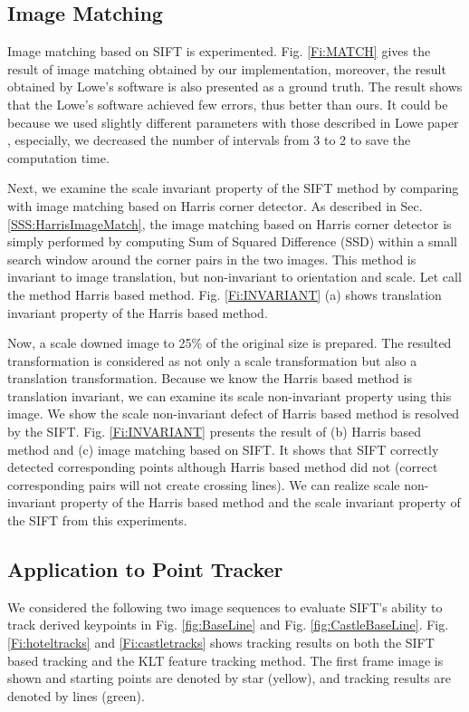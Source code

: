 \documentclass{article}
\begin{document}
\subsection{Image Matching}

Image matching based on SIFT is experimented. 
Fig. \ref{Fi:MATCH} gives the result of image matching obtained by our implementation, 
moreover, the result obtained by Lowe's software \cite{dLowe05} is also presented as a ground truth. 
The result shows that the Lowe's software achieved few errors, thus better than ours. 
It could be because we used slightly different parameters with those described in Lowe paper \cite{dLowe04}, 
especially, we decreased the number of intervals from 3 to 2 to save the computation time. 


Next, we examine the scale invariant property of the SIFT method by comparing with image matching based on Harris corner detector. 
As described in Sec. \ref{SSS:HarrisImageMatch}, the image matching based on Harris corner detector is simply performed 
by computing Sum of Squared Difference (SSD) within a small search window around the corner pairs in the two images. 
This method is invariant to image translation, but non-invariant to orientation and scale. 
Let call the method Harris based method. 
Fig. \ref{Fi:INVARIANT} (a) shows translation invariant property of the Harris based method. 

Now, a scale downed image to 25\% of the original size is prepared. 
The resulted transformation is considered as not only a scale transformation but also a translation transformation. 
Because we know the Harris based method is translation invariant, 
we can examine its scale non-invariant property using this image. 
We show the scale non-invariant defect of Harris based method is resolved by the SIFT. 
Fig. \ref{Fi:INVARIANT} presents the result of (b) Harris based method and (c) image matching based on SIFT. 
It shows that SIFT correctly detected corresponding points although Harris based method did not 
(correct corresponding pairs will not create crossing lines). 
We can realize scale non-invariant property of the Harris based method and the scale invariant property of the SIFT from this experiments. 

\subsection{Application to Point Tracker}
We considered the following two image sequences to evaluate SIFT's ability to track derived keypoints in Fig. \ref{fig:BaseLine} and Fig. \ref{fig:CastleBaseLine}. 
Fig. \ref{Fi:hoteltracks} and \ref{Fi:castletracks} shows tracking results on both the SIFT based tracking and the KLT feature tracking method. 
The first frame image is shown and starting points are denoted by star (yellow), and tracking results are denoted by lines (green). 
\end{document}
